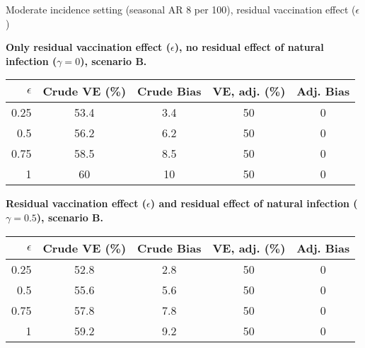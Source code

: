 \documentclass{beamer}
\begin{document}
\begin{frame}{Moderate incidence setting (seasonal AR 8 per 100), residual vaccination effect ($\epsilon$)}
	
	{\footnotesize
		\textbf{Only residual vaccination effect ($\epsilon$), no residual effect of natural infection ($\gamma=0$), scenario B.}
		\begin{table}
			\begin{tabular}{rcccc}
				$\epsilon$ & Crude VE (\%) & Crude Bias & VE, adj.  (\%)& Adj. Bias \\
				\hline
				0.25 & 53.4 & 3.4 & 50 & 0 \\ 
				0.5 & 56.2 & 6.2 & 50 & 0 \\ 
				0.75 & 58.5 & 8.5 & 50 & 0 \\ 
				1 & 60 & 10 & 50 & 0 \\
				\hline
			\end{tabular}
		\end{table}
		
		
		\textbf{Residual vaccination effect ($\epsilon$) and  residual effect of natural infection ($\gamma=0.5$), scenario B.}
		\begin{table}
			\begin{tabular}{rcccc}
				$\epsilon$ & Crude VE (\%) & Crude Bias & VE, adj.  (\%)& Adj. Bias \\
				\hline
				0.25 & 52.8 & 2.8 & 50 & 0 \\ 
				0.5 & 55.6 & 5.6 & 50 & 0 \\ 
				0.75 & 57.8 & 7.8 & 50 & 0 \\ 
				1 & 59.2 & 9.2 & 50 & 0 \\ 
				\hline
			\end{tabular}
		\end{table}
	}
\end{frame}
%
\end{document}
